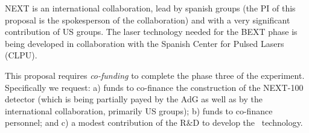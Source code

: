 NEXT is an international collaboration, lead by spanish groups (the PI of this proposal is the spokesperson of the collaboration) and with a very significant contribution of US groups. The laser technology needed for the BEXT phase is being developed in collaboration with the Spanish Center for Pulsed Lasers (CLPU). 

 This proposal requires {\em co-funding} to complete the phase three of the experiment. Specifically we request: a) funds to co-finance the construction of the NEXT-100 detector (which is being partially payed by the AdG as well as by the international collaboration, primarily US groups); b) funds to co-finance personnel; and c) a modest contribution of the R\&D to develop the \BATA\ technology.   

